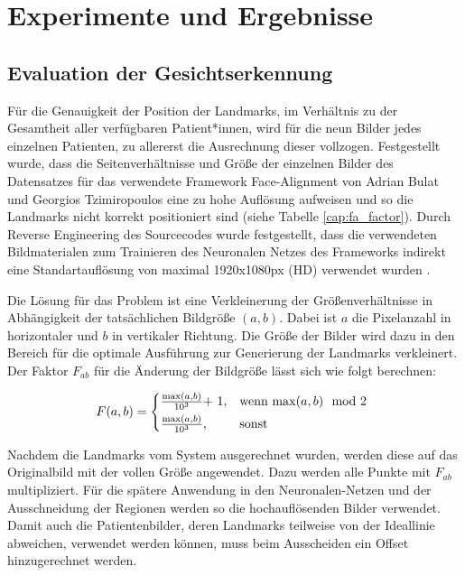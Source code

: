 
\chapter{Experimente und Ergebnisse}\label{experiment}

\section{Evaluation der Gesichtserkennung}\label{evalfa}
Für die Genauigkeit der Position der Landmarks, im Verhältnis zu der Gesamtheit aller verfügbaren Patient*innen, wird für die neun Bilder jedes einzelnen Patienten, zu allererst die Ausrechnung dieser vollzogen. Festgestellt wurde, dass die Seitenverhältnisse und Größe der einzelnen Bilder des Datensatzes für das verwendete Framework \glqq Face-Alignment\grqq{} von Adrian Bulat und Georgios Tzimiropoulos eine zu hohe Auflösung aufweisen und so die Landmarks nicht korrekt positioniert sind (siehe Tabelle \ref{cap:fa_factor}). Durch Reverse Engineering des Sourcecodes wurde festgestellt, dass die verwendeten Bildmaterialen zum Trainieren des Neuronalen Netzes des Frameworks indirekt eine Standartauflösung von maximal 1920x1080px (HD) verwendet wurden \cite{fa_framework}.


Die Lösung für das Problem ist eine Verkleinerung der Größenverhältnisse in Abhängigkeit der tatsächlichen Bildgröße $(a, b)$. Dabei ist $a$ die Pixelanzahl in horizontaler und $b$ in vertikaler Richtung. Die Größe der Bilder wird dazu in den Bereich für die optimale Ausführung zur Generierung der Landmarks verkleinert. Der Faktor $F_{ab}$ für die Änderung der Bildgröße lässt sich wie folgt berechnen:

\begin{equation}
F(a, b) = \begin{cases*}
  \frac{\max(a, b)}{10^{3}} $+ 1$,  & wenn $\max(a, b) \mod 2$  \\
  \frac{\max(a, b)}{10^{3}},        & sonst
\end{cases*}
\end{equation}

Nachdem die Landmarks vom System ausgerechnet wurden, werden diese auf das Originalbild mit der vollen Größe angewendet. Dazu werden alle Punkte mit $F_{ab}$ multipliziert. Für die spätere Anwendung in den Neuronalen-Netzen und der Ausschneidung der Regionen werden so die hochauflösenden Bilder verwendet. Damit auch die Patientenbilder, deren Landmarks teilweise von der Ideallinie abweichen, verwendet werden können, muss beim Ausscheiden ein Offset hinzugerechnet werden.

